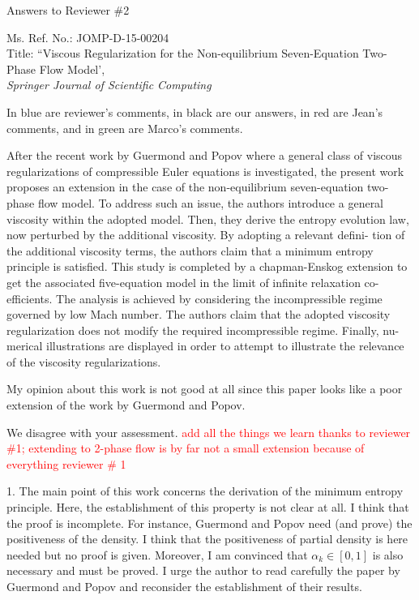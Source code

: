 \documentclass{article}
\newcommand{\tcr}[1]{\textcolor{red}{#1}}
\begin{document}

\begin{center}
{ \Large Answers to Reviewer \#2}
\end{center}

\bigskip

\noindent Ms. Ref. No.: JOMP-D-15-00204\\
Title: ``Viscous Regularization for the Non-equilibrium Seven-Equation Two-Phase Flow Model', \\
{\it Springer Journal of Scientific Computing}\\

\bigskip

In {\color{blue}blue} are reviewer's comments, in black are our answers, in {\color{red}red} are Jean's comments,
and in {\color{green}green} are Marco's comments.

\bigskip

{\color{blue}
After the recent work by Guermond and Popov where a general class of viscous
regularizations of compressible Euler equations is investigated, the present work
proposes an extension in the case of the non-equilibrium seven-equation two-
phase flow model. To address such an issue, the authors introduce a general
viscosity within the adopted model. Then, they derive the entropy evolution
law, now perturbed by the additional viscosity. By adopting a relevant defini-
tion of the additional viscosity terms, the authors claim that a minimum entropy
principle is satisfied. This study is completed by a chapman-Enskog extension
to get the associated five-equation model in the limit of infinite relaxation co-
efficients. The analysis is achieved by considering the incompressible regime
governed by low Mach number. The authors claim that the adopted viscosity
regularization does not modify the required incompressible regime. Finally, nu-
merical illustrations are displayed in order to attempt to illustrate the relevance
of the viscosity regularizations.

My opinion about this work is not good at all since this paper looks like a poor
extension of the work by Guermond and Popov.}

We disagree with your assessment. \tcr{add all the things we learn thanks to reviewer \#1; 
extending to 2-phase flow is by far not a small extension because of everything
reviewer \# 1}
\bigskip




{\color{blue}
1. The main point of this work concerns the derivation of the minimum
entropy principle. Here, the establishment of this property is not clear
at all. I think that the proof is incomplete. For instance, Guermond
and Popov need (and prove) the positiveness of the density. I think that
the positiveness of partial density is here needed but no proof is given.
Moreover, I am convinced that $\alpha_k \in [0, 1]$ is also necessary and must be
proved. I urge the author to read carefully the paper by Guermond and
Popov and reconsider the establishment of their results.}
\end{document}
